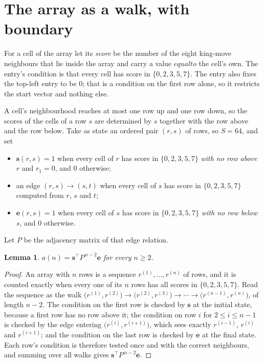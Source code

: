 \documentclass[11pt,a4paper]{article}
\theoremstyle{plain}
\newtheorem{lemma}[theorem]{Lemma}
\theoremstyle{definition}
\begin{document}
\section{The array as a walk, with boundary}

For a cell of the array let its \emph{score} be the number of the eight king-move neighbours that lie inside
the array and carry a value $equal to$ the cell's own. The entry's condition is that every cell
has score in $\{0,2,3,5,7\}$. The entry also fixes the top-left entry to be $0$; that is a condition on the first row alone, so it restricts the start vector and nothing else.

A cell's neighbourhood reaches at most one row up and one row down, so the scores of the
cells of a row $s$ are determined by $s$ together with the row above and the row below.
Take as state an ordered pair $(r,s)$ of rows, so $S=64$, and set
\begin{itemize}
\item $\mathbf{s}(r,s)=1$ when every cell of $r$ has score in $\{0,2,3,5,7\}$ \emph{with no row
above $r$} and $r_1=0$, and $0$ otherwise;
\item an edge $(r,s)\to(s,t)$ when every cell of $s$ has score in $\{0,2,3,5,7\}$ computed from
$r$, $s$ and $t$;
\item $\mathbf{e}(r,s)=1$ when every cell of $s$ has score in $\{0,2,3,5,7\}$ \emph{with no row
below $s$}, and $0$ otherwise.
\end{itemize}
Let $P$ be the adjacency matrix of that edge relation.

\begin{lemma}\label{lem:walk}
$a(n)=\mathbf{s}^{\!\top}P^{\,n-2}\mathbf{e}$ for every $n\ge2$.
\end{lemma}

\begin{proof}
An array with $n$ rows is a sequence $r^{(1)},\dots,r^{(n)}$ of rows, and it is counted
exactly when every one of its $n$ rows has all scores in $\{0,2,3,5,7\}$. Read the sequence as the
walk $\bigl(r^{(1)},r^{(2)}\bigr)\to\bigl(r^{(2)},r^{(3)}\bigr)\to\cdots\to
\bigl(r^{(n-1)},r^{(n)}\bigr)$, of length $n-2$. The condition on the first row is
checked by $\mathbf{s}$ at the initial state, because a first row has no row above it; the
condition on row $i$ for $2\le i\le n-1$ is checked by the edge entering
$\bigl(r^{(i)},r^{(i+1)}\bigr)$, which sees exactly $r^{(i-1)}$, $r^{(i)}$ and
$r^{(i+1)}$; and the condition on the last row is checked by $\mathbf{e}$ at the final
state. Each row's condition is therefore tested once and with the correct neighbours, and
summing over all walks gives $\mathbf{s}^{\!\top}P^{\,n-2}\mathbf{e}$.
\end{proof}
\end{document}
